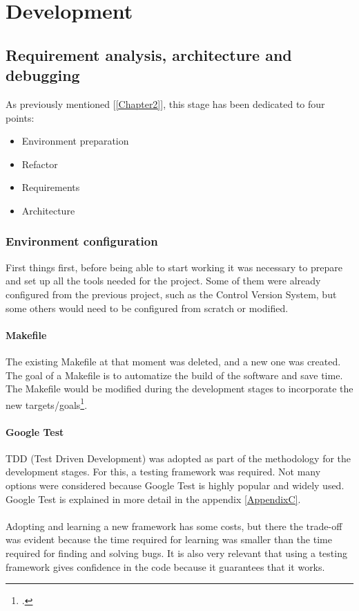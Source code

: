 \chapter{Development} 
\label{Chapter3}

\section{Requirement analysis, architecture and debugging} 
As previously mentioned [\ref{Chapter2}], this stage has been dedicated to four points: 
\begin{itemize}
	\item Environment preparation
	\item Refactor
	\item Requirements
	\item Architecture
\end{itemize}

\subsection{Environment configuration}
First things first, before being able to start working it was necessary to prepare and set up all the tools needed for the project. Some of them were already configured from the previous project, such as the Control Version System, but some others would need to be configured from scratch or modified.  


\subsubsection{Makefile}

The existing Makefile at that moment was deleted, and a new one was created. The goal of a Makefile is to automatize the build of the software and save time. The Makefile would be modified during the development stages to incorporate the new targets/goals\footcite{https://en.wikipedia.org/wiki/Makefile}.



\subsubsection{Google Test}

TDD (Test Driven Development) was adopted as part of the methodology for the development stages. For this, a testing framework was required. Not many options were considered because Google Test is highly popular and widely used.  \\
Google Test is explained in more detail in the appendix \ref{AppendixC}.\\\\
Adopting and learning a new framework has some costs, but there the trade-off was evident because the time required for learning was smaller than the time required for finding and solving bugs. It is also very relevant that using a testing framework gives confidence in the code because it guarantees that it works.  

